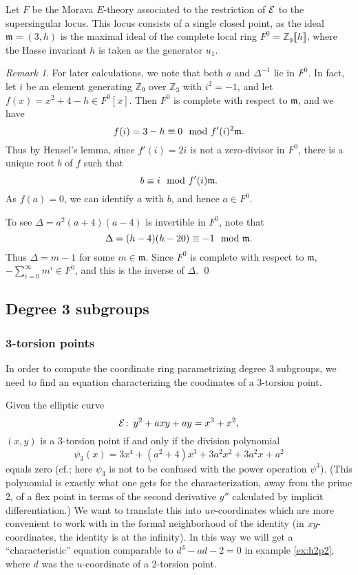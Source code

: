 \documentclass{gtpart}
\theoremstyle{definition}
\theoremstyle{remark}
\newtheorem{rmk}[thm]{Remark}
\def\co{\colon\thinspace}
\newcommand{\mb}[1]{\mathbb{#1}}
\newcommand{\mf}[1]{\mathfrak{#1}}
\newcommand{\cff}[2]{cf.\thinspace{\cite[#1]{#2}}}
\begin{document}
Let $F$ be the Morava $E$-theory associated to the restriction of $\cal E$ to 
the supersingular locus.  This locus consists of a single closed point, as 
the ideal $\mf m = (3,h)$ is the maximal ideal of the complete local ring 
$F^0 = {\mb Z}_9 \llbracket h \rrbracket$, where the Hasse invariant $h$ is 
taken as the generator $u_1$.  
\begin{rmk}
\label{rmk:adelta}
 For later calculations, we note that both $a$ and $\Delta^{-1}$ lie in $F^0$.  
 In fact, let $i$ be an element generating ${\mb Z}_9$ over ${\mb Z}_3$ with 
 $i^2 = -1$, and let $f(x) = x^2 + 4 - h \in F^0 [x]$.  Then $F^0$ is complete 
 with respect to $\mf m$, and we have 
 \[
  f(i) = 3 - h \equiv 0~~{\rm mod}~f'(i)^2 {\mf m}.  
 \]
 Thus by Hensel's lemma, since $f'(i) = 2i$ is not a zero-divisor in $F^0$, 
 there is a unique root $b$ of $f$ such that 
 \[
  b \equiv i~~{\rm mod}~f'(i) {\mf m}.  
 \]
 As $f(a) = 0$, we can identify $a$ with $b$, and hence $a \in F^0$.  

 To see $\Delta = a^2(a+4)(a-4)$ is invertible in $F^0$, note that 
 \[
  \Delta = (h-4)(h-20) \equiv -1~~{\rm mod}~{\mf m}.  
 \]
 Thus $\Delta = m-1$ for some $m \in {\mf m}$.  Since $F^0$ is complete with 
 respect to $\mf m$, $-\sum_{i=0}^\infty m^i \in F^0$, and this is the inverse 
 of $\Delta$.  \qed
\end{rmk}


\subsection{Degree 3 subgroups}
\label{subsec:step2}

\subsubsection{3-torsion points}
\label{subsec}

In order to compute the coordinate ring parametrizing degree 3 subgroups, we 
need to find an equation characterizing the coodinates of a 3-torsion point.  

Given the elliptic curve 
\[
 {\cal E}\co y^2 + a x y + a y = x^3 + x^2, 
\]
$(x,y)$ is a 3-torsion point if and only if the division polynomial 
\[
 \psi_3 (x) = 3x^4 + (a^2 + 4) x^3 + 3a^2 x^2 + 3a^2 x + a^2 
\]
equals zero (\cff{exercise 3.7(d)}{AEC}; here $\psi_3$ is not to be confused 
with the power operation $\psi^3$).  (This polynomial is exactly what one gets 
for the characterization, away from the prime 2, of a flex point in terms of 
the second derivative $y''$ calculated by implicit differentiation.)  We want 
to translate this into $uv$-coordinates which are more convenient to work with 
in the formal neighborhood of the identity (in $xy$-coordinates, the identity 
is at the infinity).  In this way we will get a ``characteristic'' equation 
comparable to $d^3 - a d - 2 = 0$ in example \ref{ex:h2p2}, where $d$ was the 
$u$-coordinate of a 2-torsion point.  
\end{document}
